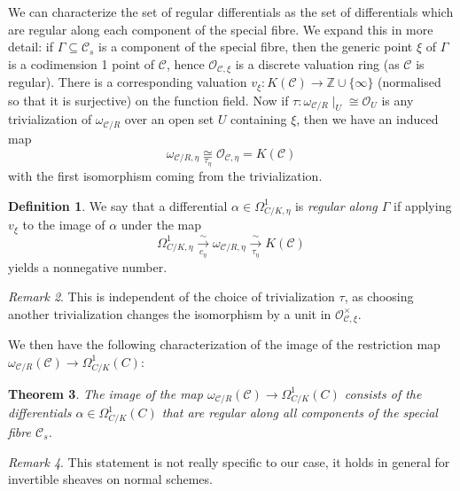 \documentclass{article}
\theoremstyle{definition}
\newtheorem{defn}{Definition}[section]
\theoremstyle{plain}
\newtheorem{thm}[defn]{Theorem}
\theoremstyle{remark}
\newtheorem{remark}[defn]{Remark}
\begin{document}
	We can characterize the set of regular differentials as the set of differentials which are regular along each component of the special fibre. We expand this in more detail: if $\Gamma\subseteq \mathcal{C}_s$ is a component of the special fibre, then the generic point $\xi$ of $\Gamma$ is a codimension 1 point of $\mathcal{C}$, hence $\mathcal{O}_{\mathcal{C}, \xi}$ is a discrete valuation ring (as $\mathcal{C}$ is regular). There is a corresponding valuation $v_\xi: K(\mathcal{C}) \to \mathbb{Z}\cup\{\infty\}$ (normalised so that it is surjective) on the function field. Now if $\tau: \omega_{\mathcal{C}/R}\mid_U \cong \mathcal{O}_U$ is any trivialization of $\omega_{\mathcal{C}/R}$ over an open set $U$ containing $\xi$, then we have an induced map
	\[ \omega_{\mathcal{C}/R, \eta} \underset{\tau_\eta}{\cong} \mathcal{O}_{\mathcal{C}, \eta} = K(\mathcal{C})\]
	with the first isomorphism coming from the trivialization.
	\begin{defn}
		We say that a differential $\alpha\in \Omega^1_{C/K, \eta}$ is \emph{regular along $\Gamma$} if applying $v_\xi$ to the image of $\alpha$ under the map
		\[\Omega^1_{C/K, \eta}\underset{c_\eta}{\xrightarrow{\sim}} \omega_{\mathcal{C}/R, \eta} \underset{\tau_\eta}{\xrightarrow{\sim}} K(\mathcal{C})\]
		yields a nonnegative number. 
	\end{defn} 
	\begin{remark}
		This is independent of the choice of trivialization $\tau$, as choosing another trivialization changes the isomorphism by a unit in $\mathcal{O}_{\mathcal{C}, \xi}^\times$.
	\end{remark}
	We then have the following characterization of the image of the restriction map $\omega_{\mathcal{C}/R}(\mathcal{C})\to \Omega^1_{C/K}(C)$:
	\begin{thm}\label{reg_diff_char}
		The image of the map $\omega_{\mathcal{C}/R}(\mathcal{C})\to \Omega^1_{C/K}(C)$ consists of the differentials $\alpha\in \Omega^1_{C/K}(C)$ that are regular along all components of the special fibre $\mathcal{C}_s$.
	\end{thm}
	\begin{remark}
		This statement is not really specific to our case, it holds in general for invertible sheaves on normal schemes.
	\end{remark}
	
\end{document}
